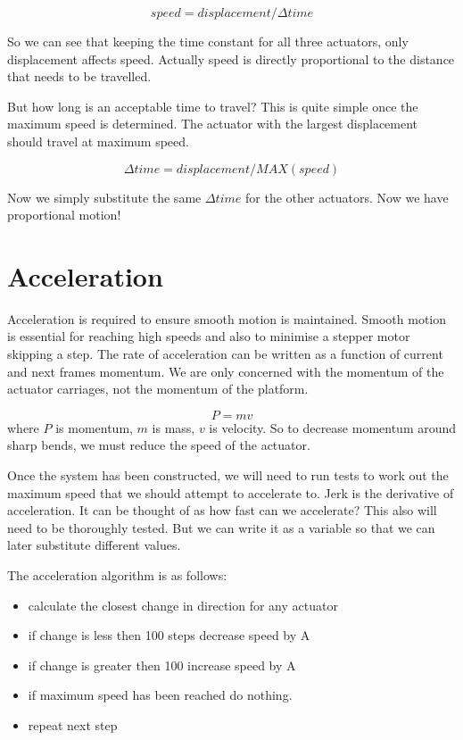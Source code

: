 \documentclass[a4paper, 11pt, twoside]{Thesis}  %
\begin{document}
$$ speed = displacement / \Delta time $$

So we can see that keeping the time constant for all three actuators, only displacement affects speed. Actually speed is directly proportional to the distance that needs to be travelled. 

But how long is an acceptable time to travel? This is quite simple once the maximum speed is determined. The actuator with the largest displacement should travel at maximum speed.

$$ \Delta time = displacement / MAX(speed) $$

Now we simply substitute the same $\Delta time$ for the other actuators. Now we have proportional motion! 
\section{Acceleration}

Acceleration is required to ensure smooth motion is maintained. Smooth motion is essential for reaching high speeds and also to minimise a stepper motor skipping a step. The rate of acceleration can be written as a function of current and next frames momentum.  We are only concerned with the momentum of the actuator carriages, not the momentum of the platform.

$$ P = mv $$
where $P$ is momentum,
$m$ is mass,
$v$ is velocity.
So to decrease momentum around sharp bends, we must reduce the speed of the actuator.

Once the system has been constructed, we will need to run tests to work out the maximum speed that we should attempt to accelerate to. Jerk is the derivative of acceleration. It can be thought of as how fast can we accelerate? This also will need to be thoroughly tested. But we can write it as a variable so that we can later substitute different values.


The acceleration algorithm is as follows:

\begin{itemize}
\item  calculate the closest change in direction for any actuator
\item  if change is less then 100 steps decrease speed by A
\item  if change is greater then 100 increase speed by A
\item  if maximum speed has been reached do nothing.
\item  repeat next step
\end{itemize}
\end{document}
